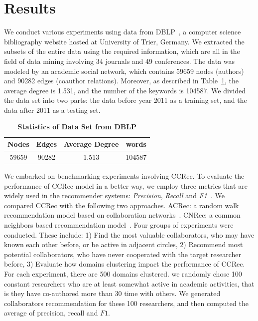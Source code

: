 \documentclass[10pt,letterpaper]{article}
\begin{document}
\section*{Results}
We conduct various experiments using data from DBLP~\cite{Ley:DBLP}, a computer science bibliography website hosted at University of Trier, Germany. We extracted the subsets of the entire data using the required information, which are all in the field of data mining involving 34 journals and 49 conferences. The data was modeled by an academic social network, which contains 59659 nodes (authors) and 90282 edges (coauthor relations). Moreover, as described in Table~\ref{tab:statdblp}, the average degree is 1.531, and the number of the keywords is 104587. We divided the data set into two parts: the data before year 2011 as a training set, and the data after 2011 as a testing set.

\begin{table}[!ht]
\begin{adjustwidth}{-2.25in}{0in}
\caption{\bf{Statistics of Data Set from DBLP}}
\label{tab:statdblp}
\begin{tabular}{|c|c|c|c|}\hline
Nodes&Edges&Average Degree&words\\\hline
59659 &90282 &1.513 &104587\\\hline
\end{tabular}
\end{adjustwidth}
\end{table}

We embarked on benchmarking experiments involving CCRec. To evaluate the performance of CCRec model in a better way, we employ three metrics that are widely used in the recommender systems: \emph{Precision}, \emph{Recall} and \emph{F1}~\cite{shani2011evaluating}. We compared CCRec with the following two approaches. ACRec: a random walk recommendation model based on collaboration networks~\cite{li2014acrec}. CNRec: a common neighbors based recommendation model~\cite{lopes2010collaboration}. Four groups of experiments were conducted. These include: 1) Find the most valuable collaborators, who may have known each other before, or be active in adjacent circles, 2) Recommend most potential collaborators, who have never cooperated with the target researcher before, 3) Evaluate how domains clustering impact the performance of CCRec. For each experiment, there are 500 domains clustered. we randomly chose 100 constant researchers who are at least somewhat active in academic activities, that is they have co-authored more than 30 time with others. We generated collaborators recommendation for these 100 researchers, and then computed the average of precision, recall and $F1$.
\end{document}
